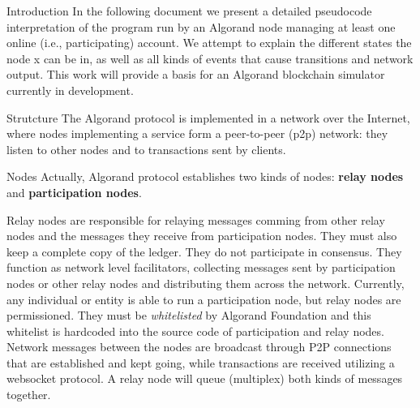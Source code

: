 \documentclass[10pt,a4paper]{article}
\begin{document}
\begin{section}{Introduction}
In the following document we present a detailed pseudocode interpretation 
of the program run by an Algorand node managing at least one online (i.e., 
participating) account. We attempt to explain the different states the node x
can be in, as well as all kinds of events that cause transitions and network 
output. This work will provide a basis for an Algorand blockchain simulator 
currently in development.

\end{section}
\begin{section}{Strutcture}
The Algorand protocol is implemented in a network over the Internet, where nodes 
implementing a service form a peer-to-peer (p2p) network: they listen to other nodes 
and to transactions sent by clients.

\begin{subsection}{Nodes}
Actually, Algorand protocol establishes two kinds of nodes: 
{\bf relay nodes} and {\bf participation nodes}.

Relay nodes are responsible for relaying messages comming from other relay nodes
and the messages they receive from participation nodes. 
They must also keep a complete copy of the ledger. 
They do not participate in consensus.
They function as network level facilitators, collecting messages sent by participation
nodes or other relay nodes and distributing them across the network.
Currently, any individual or entity is able to run a participation node, 
but relay nodes are permissioned. They must be {\em whitelisted} by 
Algorand Foundation and this whitelist is hardcoded into the source 
code of participation and relay nodes.
Network messages between the nodes are broadcast through P2P connections that are
established and kept going, while transactions are received utilizing a websocket 
protocol.
A relay node will queue (multiplex) both kinds of messages together.


\end{subsection}
\end{section}
\end{document}
